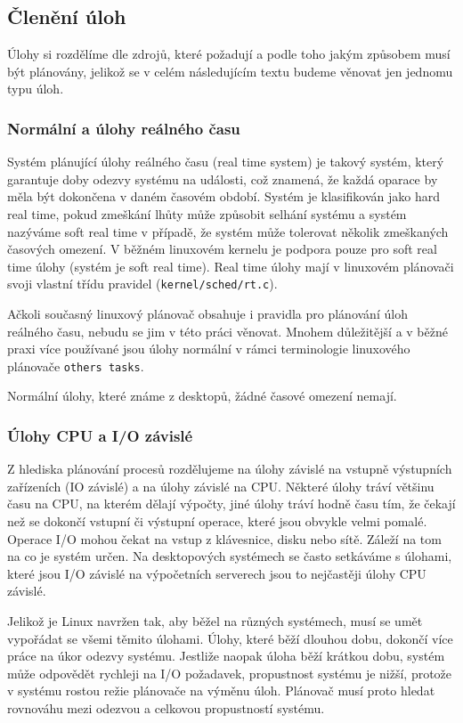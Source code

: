 \documentclass[a4paper,12pt]{article}
\begin{document}
\subsection{Členění úloh}
Úlohy si rozdělíme dle zdrojů, které požadují a podle toho jakým způsobem musí být plánovány, jelikož se v celém 
následujícím textu budeme věnovat jen jednomu typu úloh.

\subsubsection{Normální a úlohy reálného času}

Systém plánující úlohy reálného času (real time system) je takový systém, který garantuje doby odezvy systému na události, což znamená, že každá oparace by měla být dokončena v daném časovém období. Systém je klasifikován jako hard real time, pokud zmeškání lhůty může způsobit selhání systému a systém nazýváme soft real time v případě, že systém může tolerovat několik zmeškaných časových omezení. V běžném linuxovém kernelu je podpora pouze pro soft real time úlohy (systém je soft real time). Real time úlohy mají v linuxovém plánovači svoji vlastní třídu pravidel (\verb#kernel/sched/rt.c#).

Ačkoli současný linuxový plánovač obsahuje i pravidla pro plánování úloh reálného času, nebudu se jim v této práci věnovat. Mnohem důležitější a v běžné praxi více používané jsou úlohy normální v rámci terminologie linuxového plánovače \verb#others tasks#.

Normální úlohy, které známe z desktopů, žádné časové omezení nemají.

\subsubsection{Úlohy CPU a I/O závislé}

Z hlediska plánování procesů rozdělujeme na úlohy závislé na vstupně výstupních zařízeních (IO závislé) a na úlohy závislé na CPU. Některé úlohy tráví většinu času na CPU, na kterém dělají výpočty, jiné úlohy tráví hodně času tím, že čekají než se dokončí vstupní či výstupní operace, které jsou obvykle velmi pomalé. Operace I/O mohou čekat na vstup z klávesnice, disku nebo sítě. 
Záleží na tom na co je systém určen. Na desktopových systémech se často setkáváme s úlohami, které jsou I/O závislé na výpočetních serverech jsou to nejčastěji úlohy CPU závislé. 

Jelikož je Linux navržen tak, aby běžel na různých systémech, musí se umět vypořádat se všemi těmito úlohami. Úlohy, které běží dlouhou dobu, dokončí více práce na úkor odezvy systému. Jestliže naopak úloha běží krátkou dobu, systém může odpovědět rychleji na I/O požadavek, propustnost systému je nižší, protože v systému rostou režie plánovače na výměnu úloh. Plánovač musí proto hledat rovnováhu mezi odezvou a celkovou propustností systému. 
\end{document}
